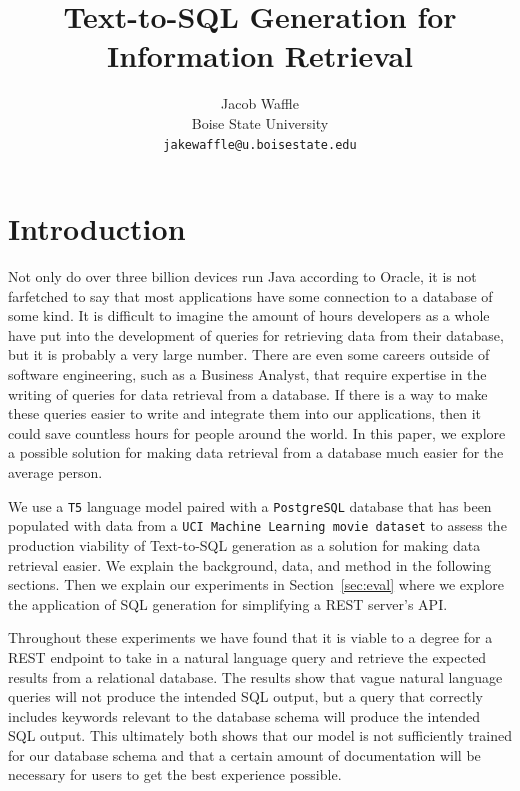 \documentclass[11pt]{article}
\title{Text-to-SQL Generation for Information Retrieval}
\author{
    Jacob Waffle \\
    Boise State University\\
    \texttt{jakewaffle@u.boisestate.edu} \\
}
\begin{document}
\maketitle
\begin{abstract}

\end{abstract}

\section{Introduction}

Not only do over three billion devices run Java according to Oracle, it is not farfetched to say that most applications have some connection to a database of some kind. It is difficult to imagine the amount of hours developers as a whole have put into the development of queries for retrieving data from their database, but it is probably a very large number. There are even some careers outside of software engineering, such as a Business Analyst, that require expertise in the writing of queries for data retrieval from a database. If there is a way to make these queries easier to write and integrate them into our applications, then it could save countless hours for people around the world. In this paper, we explore a possible solution for making data retrieval from a database much easier for the average person.

We use a \texttt{T5} language model \citep{raffel2020exploring} paired with a \texttt{PostgreSQL} database that has been populated with data from a \texttt{UCI Machine Learning movie dataset} \citep{misc_movie_132} to assess the production viability of Text-to-SQL generation as a solution for making data retrieval easier. We explain the background, data, and method in the following sections. Then we explain our experiments in Section~\ref{sec:eval} where we explore the application of SQL generation for simplifying a REST server's API.

Throughout these experiments we have found that it is viable to a degree for a REST endpoint to take in a natural language query and retrieve the expected results from a relational database. The results show that vague natural language queries will not produce the intended SQL output, but a query that correctly includes keywords relevant to the database schema will produce the intended SQL output. This ultimately both shows that our model is not sufficiently trained for our database schema and that a certain amount of documentation will be necessary for users to get the best experience possible.
\end{document}
